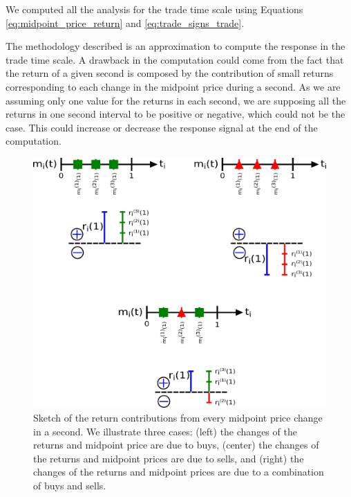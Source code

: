 We computed all the analysis for the trade time scale using Equations
\ref{eq:midpoint_price_return} and \ref{eq:trade_signs_trade}.

The methodology described is an approximation to compute the response in the
trade time scale. A drawback in the computation could come from the fact that
the return of a given second is composed by the contribution of small returns
corresponding to each change in the midpoint price during a second. As we are
assuming only one value for the returns in each second, we are supposing  all
the returns in one second interval to be positive or negative, which could not
be the case. This could increase or decrease the response signal at the end of
the computation.

\begin{figure}[htbp]
    \centering
    \includegraphics[width=\columnwidth]{figures/02_return_contributions.png}
    \caption{Sketch of the return contributions from every midpoint price
             change in a second. We illustrate three cases: (left) the changes
             of the returns and midpoint price are due to buys, (center) the
             changes of the returns and midpoint prices are due to sells, and
             (right) the changes of the returns and midpoint prices are due to
             a combination of buys and sells.}
    \label{fig:return_contributions}
\end{figure}

